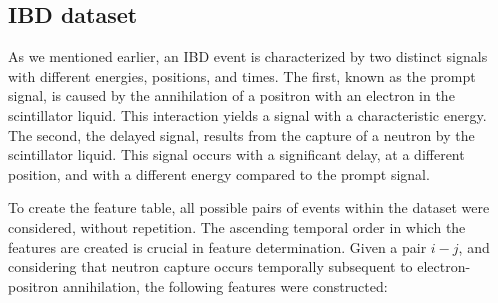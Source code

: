 \subsection{IBD dataset}
As we mentioned earlier, an IBD event is characterized by two distinct signals with different energies, positions, and times. The first, known as the prompt signal, is caused by the annihilation of a positron with an electron in the scintillator liquid. This interaction yields a signal with a characteristic energy. The second, the delayed signal, results from the capture of a neutron by the scintillator liquid. This signal occurs with a significant delay, at a different position, and with a different energy compared to the prompt signal.

To create the feature table, all possible pairs of events within the dataset were considered, without repetition. The ascending temporal order in which the features are created is crucial in feature determination. Given a pair $i-j$, and considering that neutron capture occurs temporally subsequent to electron-positron annihilation, the following features were constructed:


